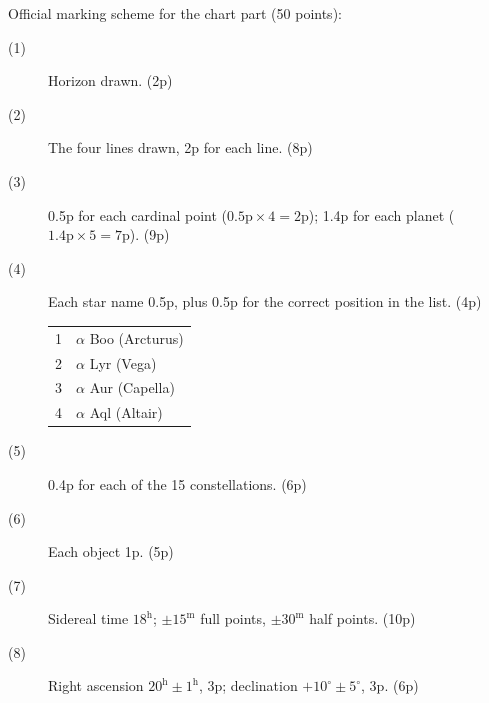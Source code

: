 Official marking scheme for the chart part (50 points):

\begin{description}
\item[(1)] Horizon drawn. \hfill(2p)
\item[(2)] The four lines drawn, 2p for each line. \hfill(8p)
\item[(3)] 0.5p for each cardinal point ($0.5\mathrm{p} \times 4 =
  2\mathrm{p}$); 1.4p for each planet ($1.4\mathrm{p} \times 5 =
  7\mathrm{p}$). \hfill(9p)
\item[(4)] Each star name 0.5p, plus 0.5p for the correct position in the
  list. \hfill(4p)

  \begin{center}
  \begin{tabular}{cl}
  \hline
  1 & $\alpha$ Boo (Arcturus) \\
  2 & $\alpha$ Lyr (Vega) \\
  3 & $\alpha$ Aur (Capella) \\
  4 & $\alpha$ Aql (Altair) \\
  \hline
  \end{tabular}
  \end{center}
\item[(5)] 0.4p for each of the 15 constellations. \hfill(6p)
\item[(6)] Each object 1p. \hfill(5p)
\item[(7)] Sidereal time $18^{\mathrm{h}}$; $\pm 15^{\mathrm{m}}$ full
  points, $\pm 30^{\mathrm{m}}$ half points. \hfill(10p)
\item[(8)] Right ascension $20^{\mathrm{h}} \pm 1^{\mathrm{h}}$, 3p;
  declination $+10^\circ \pm 5^\circ$, 3p. \hfill(6p)
\end{description}
